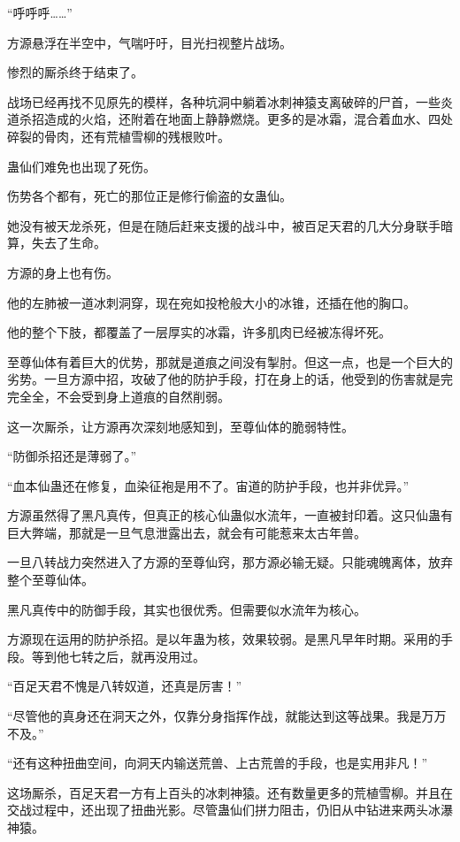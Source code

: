 
\begin{this_body}

“呼呼呼……”

方源悬浮在半空中，气喘吁吁，目光扫视整片战场。

惨烈的厮杀终于结束了。

战场已经再找不见原先的模样，各种坑洞中躺着冰刺神猿支离破碎的尸首，一些炎道杀招造成的火焰，还附着在地面上静静燃烧。更多的是冰霜，混合着血水、四处碎裂的骨肉，还有荒植雪柳的残根败叶。

蛊仙们难免也出现了死伤。

伤势各个都有，死亡的那位正是修行偷盗的女蛊仙。

她没有被天龙杀死，但是在随后赶来支援的战斗中，被百足天君的几大分身联手暗算，失去了生命。

方源的身上也有伤。

他的左肺被一道冰刺洞穿，现在宛如投枪般大小的冰锥，还插在他的胸口。

他的整个下肢，都覆盖了一层厚实的冰霜，许多肌肉已经被冻得坏死。

至尊仙体有着巨大的优势，那就是道痕之间没有掣肘。但这一点，也是一个巨大的劣势。一旦方源中招，攻破了他的防护手段，打在身上的话，他受到的伤害就是完完全全，不会受到身上道痕的自然削弱。

这一次厮杀，让方源再次深刻地感知到，至尊仙体的脆弱特性。

“防御杀招还是薄弱了。”

“血本仙蛊还在修复，血染征袍是用不了。宙道的防护手段，也并非优异。”

方源虽然得了黑凡真传，但真正的核心仙蛊似水流年，一直被封印着。这只仙蛊有巨大弊端，那就是一旦气息泄露出去，就会有可能惹来太古年兽。

一旦八转战力突然进入了方源的至尊仙窍，那方源必输无疑。只能魂魄离体，放弃整个至尊仙体。

黑凡真传中的防御手段，其实也很优秀。但需要似水流年为核心。

方源现在运用的防护杀招。是以年蛊为核，效果较弱。是黑凡早年时期。采用的手段。等到他七转之后，就再没用过。

“百足天君不愧是八转奴道，还真是厉害！”

“尽管他的真身还在洞天之外，仅靠分身指挥作战，就能达到这等战果。我是万万不及。”

“还有这种扭曲空间，向洞天内输送荒兽、上古荒兽的手段，也是实用非凡！”

这场厮杀，百足天君一方有上百头的冰刺神猿。还有数量更多的荒植雪柳。并且在交战过程中，还出现了扭曲光影。尽管蛊仙们拼力阻击，仍旧从中钻进来两头冰瀑神猿。


\end{this_body}
